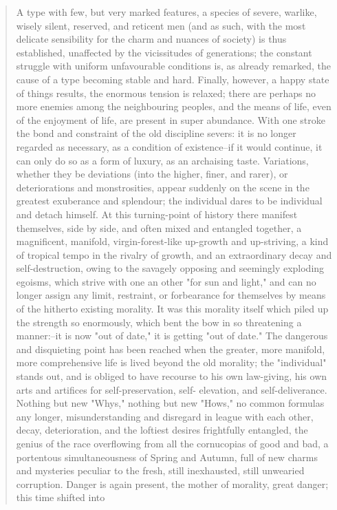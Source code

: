 \begin{quotation}
A type with few, but very marked features, a species of severe, warlike, wisely silent, reserved,
and reticent men (and as such, with the most delicate sensibility for the charm and nuances of
society) is thus established, unaffected by the vicissitudes of generations; the constant struggle
with uniform unfavourable conditions is, as already remarked, the cause of a type becoming
stable and hard. Finally, however, a happy state of things results, the enormous tension is
relaxed; there are perhaps no more enemies among the neighbouring peoples, and the means of
life, even of the enjoyment of life, are present in super abundance. With one stroke the bond and
constraint of the old discipline severs: it is no longer regarded as necessary, as a condition of
existence--if it would continue, it can only do so as a form of luxury, as an archaising taste.
Variations, whether they be deviations (into the higher, finer, and rarer), or deteriorations and
monstrosities, appear suddenly on the scene in the greatest exuberance and splendour; the
individual dares to be individual and detach himself. At this turning-point of history there
manifest themselves, side by side, and often mixed and entangled together, a magnificent,
manifold, virgin-forest-like up-growth and up-striving, a kind of tropical tempo in the rivalry of
growth, and an extraordinary decay and self-destruction, owing to the savagely opposing and
seemingly exploding egoisms, which strive with one an other "for sun and light," and can no
longer assign any limit, restraint, or forbearance for themselves by means of the hitherto existing
morality. It was this morality itself which piled up the strength so enormously, which bent the
bow in so threatening a manner:--it is now "out of date," it is getting "out of date." The
dangerous and disquieting point has been reached when the greater, more manifold, more
comprehensive life is lived beyond the old morality; the "individual" stands out, and is obliged to
have recourse to his own law-giving, his own arts and artifices for self-preservation, self-
elevation, and self-deliverance. Nothing but new "Whys," nothing but new "Hows," no common
formulas any longer, misunderstanding and disregard in league with each other, decay,
deterioration, and the loftiest desires frightfully entangled, the genius of the race overflowing
from all the cornucopias of good and bad, a portentous simultaneousness of Spring and Autumn,
full of new charms and mysteries peculiar to the fresh, still inexhausted, still unwearied
corruption. Danger is again present, the mother of morality, great danger; this time shifted into

\end{quotation}
